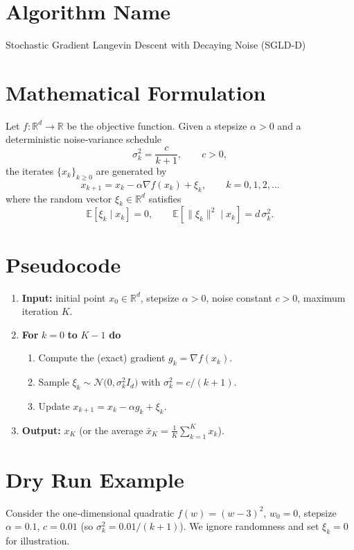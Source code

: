 \documentclass{article}
\begin{document}
\section*{Algorithm Name}
Stochastic Gradient Langevin Descent with Decaying Noise (SGLD‑D)

\section*{Mathematical Formulation}
Let $f:\mathbb{R}^{d}\to\mathbb{R}$ be the objective function.  
Given a stepsize $\alpha>0$ and a deterministic noise‑variance schedule
\[
\sigma_k^2=\frac{c}{k+1},\qquad c>0,
\]
the iterates $\{x_k\}_{k\ge 0}$ are generated by
\begin{equation}\label{eq:update}
x_{k+1}=x_k-\alpha \nabla f(x_k)+\xi_k,\qquad k=0,1,2,\dots
\end{equation}
where the random vector $\xi_k\in\mathbb{R}^{d}$ satisfies
\[
\mathbb{E}[\xi_k\mid x_k]=0,\qquad
\mathbb{E}\!\left[\|\xi_k\|^{2}\mid x_k\right]=d\,\sigma_k^{2}.
\]

\section*{Pseudocode}
\begin{enumerate}[label=Step \arabic*:, leftmargin=*]
\item \textbf{Input:} initial point $x_0\in\mathbb{R}^{d}$, stepsize $\alpha>0$, noise constant $c>0$, maximum iteration $K$.
\item \textbf{For} $k=0$ \textbf{to} $K-1$ \textbf{do}
\begin{enumerate}[label=\arabic*.]
\item Compute the (exact) gradient $g_k=\nabla f(x_k)$.
\item Sample $\xi_k\sim\mathcal{N}\!\big(0,\sigma_k^{2}I_{d}\big)$ with $\sigma_k^{2}=c/(k+1)$.
\item Update $x_{k+1}=x_k-\alpha g_k+\xi_k$.
\end{enumerate}
\item \textbf{Output:} $x_{K}$ (or the average $\bar x_{K}=\frac1K\sum_{k=1}^{K}x_k$).
\end{enumerate}

\section*{Dry Run Example}
Consider the one‑dimensional quadratic $f(w)=(w-3)^{2}$, $w_0=0$, stepsize $\alpha=0.1$, $c=0.01$ (so $\sigma_k^{2}=0.01/(k+1)$).  
We ignore randomness and set $\xi_k=0$ for illustration.
\end{document}
